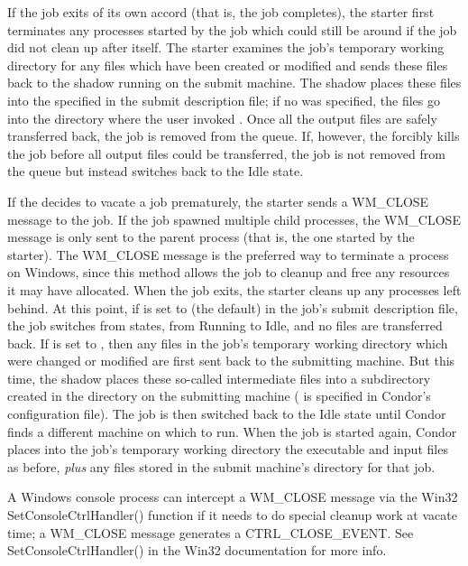 If the job exits of its own accord (that is, the job completes),
the starter
first terminates any processes started by the job which could still be
around if the job did not clean up after itself.
The starter examines the job's temporary working directory for any
files which have been created or modified and sends these files back
to the shadow running on the submit machine.
The shadow
places these files into the  specified in the
submit description file; if no  was specified, the files go
into the directory where the user invoked .
Once all the output files are safely transferred back,
the job is removed from the queue.
If, however, the  forcibly kills the job before all output files
could be transferred, the job is not removed from the queue but instead
switches back to the Idle state.  

If the  decides to vacate a job prematurely,
the starter sends a WM\_CLOSE message to the job.
If the job spawned multiple child processes, the WM\_CLOSE message is only
sent to the parent process (that is, the one started by the starter).
The
WM\_CLOSE message is the preferred way to terminate a process on Windows,
since this method allows the job to cleanup and free any resources it may
have allocated.
When the job exits, the starter cleans up any processes left behind.
At this point, if  is set to
 (the default) in the job's submit description file,
the job switches from states, from Running to Idle,
and no files are transferred back.
If  is set to , then any files
in the job's temporary working directory which were changed or modified are
first sent back to the submitting machine.
But this time, the shadow places these
so-called intermediate files into a subdirectory created in the
 directory on the submitting machine
( is specified in Condor's configuration file).
The job is then switched back to the Idle state until Condor finds
a different machine on which to run.
When the job is started again,
Condor places into the job's temporary working directory the executable
and input files as before,
\emph{plus} any files stored in the submit machine's  directory for that job.  

\Note A Windows console process can intercept a WM\_CLOSE message
via the Win32 SetConsoleCtrlHandler() function if it needs to do special
cleanup work at vacate time; a WM\_CLOSE message
generates a CTRL\_CLOSE\_EVENT.  See SetConsoleCtrlHandler() in the Win32
documentation for more info.

